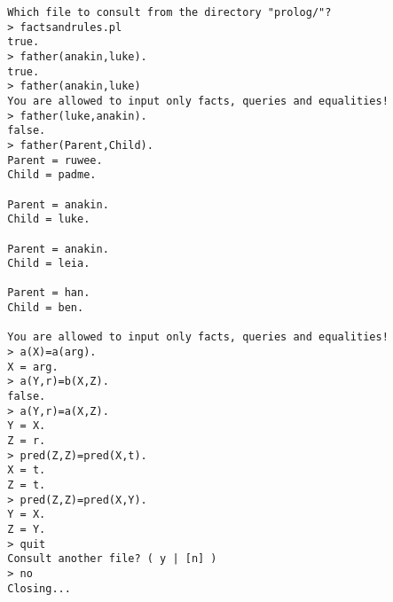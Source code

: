 \documentclass[15pt]{extarticle}
\begin{document}
	\begin{lstlisting}
		Which file to consult from the directory "prolog/"?
		> factsandrules.pl
		true.
		> father(anakin,luke).
		true.
		> father(anakin,luke)
		You are allowed to input only facts, queries and equalities!
		> father(luke,anakin).
		false.
		> father(Parent,Child).
		Parent = ruwee.
		Child = padme.
		
		Parent = anakin.
		Child = luke.
		
		Parent = anakin.
		Child = leia.
		
		Parent = han.
		Child = ben.
			
		You are allowed to input only facts, queries and equalities!
		> a(X)=a(arg).
		X = arg.
		> a(Y,r)=b(X,Z).
		false.
		> a(Y,r)=a(X,Z).
		Y = X.
		Z = r.
		> pred(Z,Z)=pred(X,t).
		X = t.
		Z = t.
		> pred(Z,Z)=pred(X,Y).
		Y = X.
		Z = Y.
		> quit
		Consult another file? ( y | [n] )
		> no
		Closing...
		
	\end{lstlisting}
	
	
\end{document}
